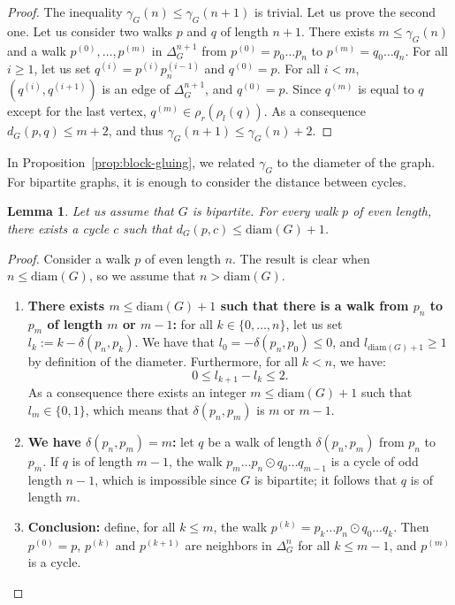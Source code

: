 \documentclass{article}
\newtheorem{lemma}[theorem]{Lemma}
\begin{document}
\begin{proof}
The inequality $\gamma_G(n) \le\gamma_G(n+1)$ is trivial. Let us prove the second one. Let us consider two walks $p$ and $q$ of length $n+1$. 
There exists $m \le\gamma_G(n)$ and a walk $p^{(0)}, \dots , p^{(m)}$ in $\Delta^{n+1}_G$ from $p^{(0)} = p_0 \hdots p_{n}$ to $p^{(m)} = q_0 \hdots q_{n}$. For all $i \ge 1$, let us set $q^{(i)} = p^{(i)} p^{(i-1)}_n$ and $q^{(0)} = p$. For all $i < m$, $(q^{(i)},q^{(i+1)})$ is an 
edge of $\Delta^{n+1}_G$, and $q^{(0)} = p$. Since $q^{(m)}$ is equal to $q$ except for the last vertex, $q^{(m)} \in \rho_r (\rho_l(q))$. As a consequence $d_G(p,q) \le m+2$, and thus $\gamma_G(n+1) \le\gamma_G(n)+2$.
\end{proof}

In Proposition~\ref{prop:block-gluing}, we related $\gamma_G$ to the diameter of the graph. For bipartite graphs, it is enough to consider the distance between cycles.

\begin{lemma}\label{lemma.walks.to.cycles}
Let us assume that $G$ is bipartite. For every walk $p$ of even length, there exists a cycle $c$ such that $d_G(p, c)\leq \text{diam}(G)+1$.
\end{lemma}

\begin{proof}
Consider a walk $p$ of even length $n$. The result is clear when $n \leq\text{diam}(G)$, so we assume that $n >\text{diam}(G)$.
\begin{enumerate}
\item \textbf{There exists $m \le\text{diam}(G)+1$ such that there is a walk from $p_{n}$ to $p_m$ of length 
$m$ or $m-1$:} for all $k \in \{0, \dots, n\}$, let us set $l_k := k - \delta(p_n,p_k)$. We have that $l_0 = -\delta(p_n,p_0) \le 0$, and $l_{\text{diam}(G)+1} \ge 1$ by definition of the diameter. 
Furthermore, for all $k < n$, we have: 
\[ 0 \le l_{k+1} - l_k \le 2.\]
As a consequence there exists an integer $m \le\text{diam}(G)+1$ such that $l_m \in \{0,1\}$, which means that $\delta(p_n,p_m)$ is $m$ or $m-1$.

\item \textbf{We have $\delta(p_n,p_m)=m$:} let $q$ be a walk of length $\delta(p_n,p_m)$ from $p_n$ to $p_m$. If $q$ is of length $m-1$, the walk $p_m \hdots p_n \odot q_0 \hdots q_{m-1}$ is a cycle of odd length $n-1$, which is impossible since $G$ is bipartite; it follows that $q$ is of length $m$.
 
\item \textbf{Conclusion:} define, for all $k \le m$, the walk $p^{(k)} = p_k \hdots p_n \odot q_0 \hdots q_k$. 
Then $p^{(0)} = p$, $p^{(k)}$ and $p^{(k+1)}$ are neighbors in $\Delta^n_G$ for all $k \le m-1$, 
and $p^{(m)}$ is a cycle. \qedhere
\end{enumerate}
\end{proof}
\end{document}
